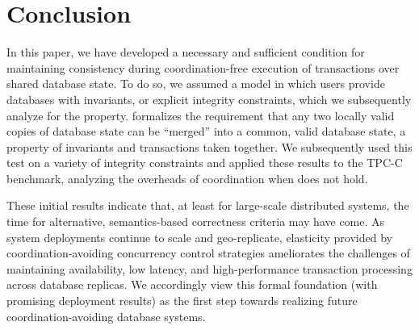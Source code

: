 
\section{Conclusion}
\label{sec:conclusion}

In this paper, we have developed a necessary and sufficient condition
for maintaining consistency during coordination-free execution of
transactions over shared database state. To do so, we assumed a model
in which users provide databases with invariants, or explicit
integrity constraints, which we subsequently analyze for the
\iconfluence property. \iconfluence formalizes the requirement that
any two locally valid copies of database state can be ``merged'' into
a common, valid database state, a property of invariants and
transactions taken together. We subsequently used this test on a
variety of integrity constraints and applied these results to the
TPC-C benchmark, analyzing the overheads of coordination when
\iconfluence does not hold.

These initial results indicate that, at least for large-scale
distributed systems, the time for alternative, semantics-based
correctness criteria may have come. As system deployments continue to
scale and geo-replicate, elasticity provided by coordination-avoiding
concurrency control strategies ameliorates the challenges of
maintaining availability, low latency, and high-performance
transaction processing across database replicas. We accordingly view
this formal foundation (with promising deployment results) as the
first step towards realizing future coordination-avoiding database
systems.
